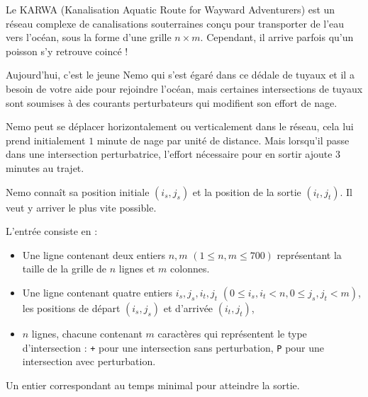 \problemname{\problemyamlname{}}


Le KARWA (Kanalisation Aquatic Route for Wayward Adventurers) est un réseau complexe de canalisations souterraines conçu pour transporter de l'eau vers l'océan, sous la forme d'une grille $n \times m$. Cependant, il arrive parfois qu'un poisson s'y retrouve coincé !

Aujourd'hui, c'est le jeune Nemo qui s'est égaré dans ce dédale de tuyaux et il a besoin de votre aide pour rejoindre l'océan, mais certaines intersections de tuyaux sont soumises à des courants perturbateurs qui modifient son effort de nage.

Nemo peut se déplacer horizontalement ou verticalement dans le réseau, cela lui prend initialement $1$ minute de nage par unité de distance. Mais lorsqu'il passe dans une intersection perturbatrice, l'effort nécessaire pour en sortir ajoute $3$ minutes au trajet.

Nemo connaît sa position initiale $(i_s, j_s)$ et la position de la sortie $(i_t, j_t)$. Il veut y arriver le plus vite possible.

\begin{Input}
    L'entrée consiste en :
    \begin{itemize}
        \item Une ligne contenant deux entiers $n, m$ $(1 \leq n, m \leq 700)$ représentant la taille de la grille de $n$ lignes et $m$ colonnes.
        \item Une ligne contenant quatre entiers $i_s, j_s, i_t, j_t$ $(0 \leq i_s, i_t < n, 0 \leq j_s, j_t < m)$, les positions de départ $(i_s,j_s)$ et d'arrivée $(i_t,j_t)$,
        \item $n$ lignes, chacune contenant $m$ caractères qui représentent le type d'intersection : \texttt{+} pour une intersection sans perturbation, \texttt{P} pour une intersection avec perturbation.
    \end{itemize}
\end{Input}

\begin{Output}
    Un entier correspondant au temps minimal pour atteindre la sortie.
\end{Output}